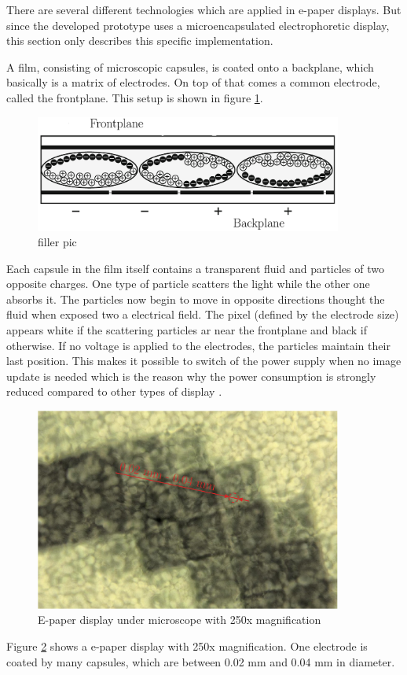 There are several different technologies which are applied in e-paper displays.
But since the developed prototype uses a microencapsulated electrophoretic display, this section only describes this specific implementation.

A film, consisting of microscopic capsules, is coated onto a backplane, which basically is a matrix of electrodes.
On top of that comes a common electrode, called the frontplane.
This setup is shown in figure \ref{theory:capsules}.

\begin{figure}[h]
	\centering
	\includegraphics[width=0.9\textwidth]{2-theory/e-paper-display/graphics/capsules.pdf}
	\caption{filler pic\label{theory:capsules}}
\end{figure}

Each capsule in the film itself contains a transparent fluid and particles of two opposite charges.
One type of particle scatters the light while the other one absorbs it.
The particles now begin to move in opposite directions thought the fluid when exposed two a electrical field. 
The pixel (defined by the electrode size) appears white if the scattering particles ar near the frontplane and black if otherwise.
If no voltage is applied to the electrodes, the particles maintain their last position.
This makes it possible to switch of the power supply when no image update is needed which is the reason why the power consumption is strongly reduced compared to other types of display \cite{amundson}.

\begin{figure}[h]
	\centering
	\includegraphics[width=0.9\textwidth]{2-theory/e-paper-display/graphics/epaper_mikroskop.pdf}
	\caption{E-paper display under microscope with 250x magnification\label{theory:micro}}
\end{figure}

Figure \ref{theory:micro} shows a e-paper display with 250x magnification.
One electrode is coated by many capsules, which are between 0.02 mm and 0.04 mm in diameter.